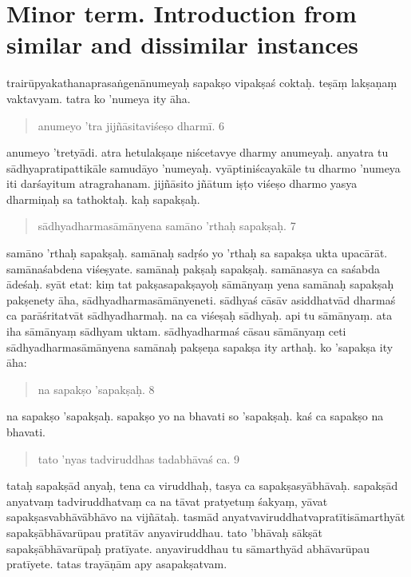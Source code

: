 \documentclass{article}
\begin{document}
\section{Minor term. Introduction from similar and dissimilar instances}
\pstart 
 trairūpyakathanaprasaṅgenānumeyaḥ sapakṣo vipakṣaś coktaḥ. teṣāṃ lakṣaṇaṃ vaktavyam. tatra ko 'numeya ity āha. 
 \pend
\pstart
 \begin{quote}
anumeyo 'tra jijñāsitaviśeṣo dharmī. 6
\end{quote}
\pend
\pstart
{}anumeyo 'tretyādi. atra hetulakṣaṇe niścetavye dharmy anumeyaḥ. anyatra tu sādhyapratipattikāle samudāyo 'numeyaḥ. vyāptiniścayakāle tu dharmo 'numeya iti darśayitum atragrahanam. jijñāsito jñātum iṣṭo viśeṣo dharmo yasya dharmiṇaḥ sa tathoktaḥ.
\pend
\pstart
kaḥ sapakṣaḥ.
\begin{quote}
sādhyadharmasāmānyena samāno 'rthaḥ sapakṣaḥ. 7
\end{quote}
\pend
\pstart
samāno 'rthaḥ sapakṣaḥ. samānaḥ sadṛśo yo 'rthaḥ sa sapakṣa ukta upacārāt. samānaśabdena viśeṣyate. samānaḥ pakṣaḥ sapakṣaḥ. samānasya ca saśabda ādeśaḥ. 
 \pend
 \pstart
{}syāt etat: kiṃ tat pakṣasapakṣayoḥ sāmānyaṃ yena samānaḥ sapakṣaḥ pakṣenety āha, sādhyadharmasāmānyeneti. sādhyaś cāsāv asiddhatvād dharmaś ca parāśritatvāt sādhyadharmaḥ. na ca viśeṣaḥ sādhyaḥ. api tu sāmānyaṃ. ata iha sāmānyaṃ sādhyam uktam. sādhyadharmaś cāsau sāmānyaṃ ceti sādhyadharmasāmānyena samānaḥ pakṣeṇa sapakṣa ity arthaḥ.
\pend
\pstart
ko 'sapakṣa ity āha: 
\pend
\pstart
\begin{quote}
na sapakṣo 'sapakṣaḥ. 8
\end{quote}
\pend
\pstart
na sapakṣo 'sapakṣaḥ. sapakṣo yo na bhavati so 'sapakṣaḥ.
\pend
\pstart
kaś ca sapakṣo na bhavati.
\pend
\pstart
\begin{quote}
tato 'nyas tadviruddhas tadabhāvaś ca. 9
\end{quote}
\pend
\pstart
tataḥ sapakṣād anyaḥ, tena ca viruddhaḥ, tasya ca sapakṣasyābhāvaḥ. sapakṣād anyatvaṃ tadviruddhatvaṃ ca na tāvat pratyetuṃ śakyaṃ, yāvat sapakṣasvabhāvābhāvo na vijñātaḥ. tasmād anyatvaviruddhatvapratītisāmarthyāt sapakṣābhāvarūpau pratītāv anyaviruddhau.
\pend
\pstart
{}tato 'bhāvaḥ sākṣāt sapakṣābhāvarūpaḥ pratīyate. anyaviruddhau tu sāmarthyād abhāvarūpau pratīyete. tatas trayāṇām apy asapakṣatvam. 
\pend
{}\baselineskip
\endnumbering
\end{document}
